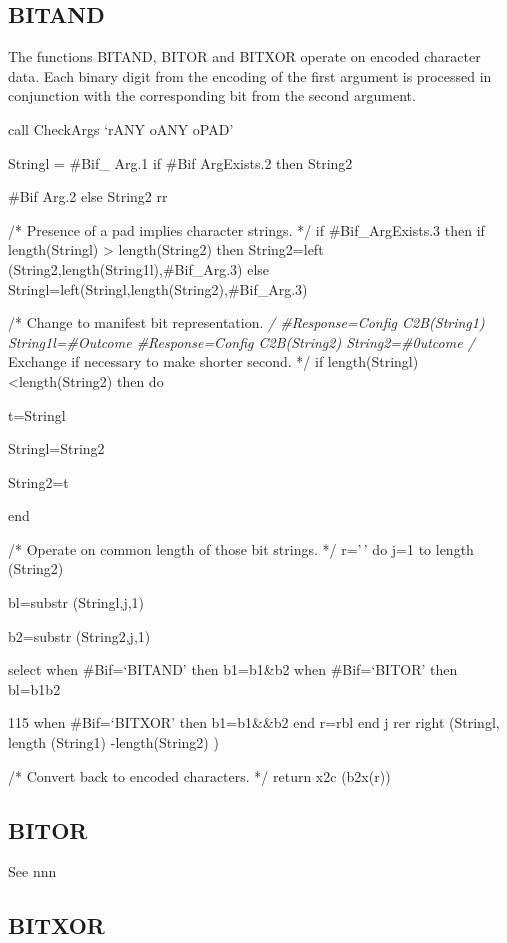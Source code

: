 \hypertarget{bitand}{%
\subsection{BITAND}\label{bitand}}

The functions BITAND, BITOR and BITXOR operate on encoded character
data. Each binary digit from the encoding of the first argument is
processed in conjunction with the corresponding bit from the second
argument.

call CheckArgs `rANY oANY oPAD'

Stringl = \#Bif\_ Arg.1 if \#Bif ArgExists.2 then String2

\#Bif Arg.2 else String2 rr

/* Presence of a pad implies character strings. */ if \#Bif\_ArgExists.3
then if length(Stringl) \textgreater{} length(String2) then String2=left
(String2,length(String1l),\#Bif\_Arg.3) else
Stringl=left(Stringl,length(String2),\#Bif\_Arg.3)

/* Change to manifest bit representation. \emph{/ \#Response=Config
C2B(String1) String1l=\#Outcome \#Response=Config C2B(String2)
String2=\#0utcome /} Exchange if necessary to make shorter second. */ if
length(Stringl)\textless length(String2) then do

t=Stringl

Stringl=String2

String2=t

end

/* Operate on common length of those bit strings. */ r='\,' do j=1 to
length (String2)

bl=substr (Stringl,j,1)

b2=substr (String2,j,1)

select when \#Bif=`BITAND' then b1=b1\&b2 when \#Bif=`BITOR' then
bl=b1\textbar b2

115 when \#Bif=`BITXOR' then b1=b1\&\&b2 end r=r\textbar\textbar bl end
j rer \textbar\textbar{} right (Stringl, length (String1)
-length(String2) )

/* Convert back to encoded characters. */ return x2c (b2x(r))

\hypertarget{bitor}{%
\subsection{BITOR}\label{bitor}}

See nnn

\hypertarget{bitxor}{%
\subsection{BITXOR}\label{bitxor}}

